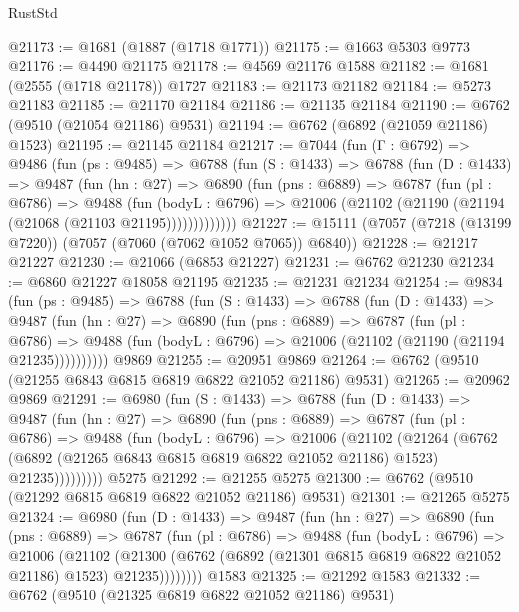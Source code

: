 \begin{lexlean}{RustStd}
\begin{coremodule}
@21173 := @1681 (@1887 (@1718 @1771))
@21175 := @1663 @5303 @9773
@21176 := @4490 @21175
@21178 := @4569 @21176 @1588
@21182 := @1681 (@2555 (@1718 @21178)) @1727
@21183 := @21173 @21182
@21184 := @5273 @21183
@21185 := @21170 @21184
@21186 := @21135 @21184
@21190 := @6762 (@9510 (@21054 @21186) @9531)
@21194 := @6762 (@6892 (@21059 @21186) @1523)
@21195 := @21145 @21184
@21217 := @7044
    (fun (Γ : @6792) =>
    @9486
      (fun (ps : @9485) =>
      @6788
        (fun (S : @1433) =>
        @6788
          (fun (D : @1433) =>
          @9487
            (fun (hn : @27) =>
            @6890
              (fun (pns : @6889) =>
              @6787
                (fun (pl : @6786) =>
                @9488
                  (fun (bodyL : @6796) =>
                  @21006 (@21102 (@21190 (@21194 (@21068 (@21103 @21195)))))))))))))
@21227 := @15111 (@7057 (@7218 (@13199 @7220)) (@7057 (@7060 (@7062 @1052 @7065)) @6840))
@21228 := @21217 @21227
@21230 := @21066 (@6853 @21227)
@21231 := @6762 @21230
@21234 := @6860 @21227 @18058 @21195
@21235 := @21231 @21234
@21254 := @9834
    (fun (ps : @9485) =>
    @6788
      (fun (S : @1433) =>
      @6788
        (fun (D : @1433) =>
        @9487
          (fun (hn : @27) =>
          @6890
            (fun (pns : @6889) =>
            @6787
              (fun (pl : @6786) =>
              @9488 (fun (bodyL : @6796) => @21006 (@21102 (@21190 (@21194 @21235))))))))))
    @9869
@21255 := @20951 @9869
@21264 := @6762 (@9510 (@21255 @6843 @6815 @6819 @6822 @21052 @21186) @9531)
@21265 := @20962 @9869
@21291 := @6980
    (fun (S : @1433) =>
    @6788
      (fun (D : @1433) =>
      @9487
        (fun (hn : @27) =>
        @6890
          (fun (pns : @6889) =>
          @6787
            (fun (pl : @6786) =>
            @9488
              (fun (bodyL : @6796) =>
              @21006
                (@21102
                  (@21264
                    (@6762
                      (@6892 (@21265 @6843 @6815 @6819 @6822 @21052 @21186) @1523)
                      @21235)))))))))
    @5275
@21292 := @21255 @5275
@21300 := @6762 (@9510 (@21292 @6815 @6819 @6822 @21052 @21186) @9531)
@21301 := @21265 @5275
@21324 := @6980
    (fun (D : @1433) =>
    @9487
      (fun (hn : @27) =>
      @6890
        (fun (pns : @6889) =>
        @6787
          (fun (pl : @6786) =>
          @9488
            (fun (bodyL : @6796) =>
            @21006
              (@21102
                (@21300 (@6762 (@6892 (@21301 @6815 @6819 @6822 @21052 @21186) @1523) @21235))))))))
    @1583
@21325 := @21292 @1583
@21332 := @6762 (@9510 (@21325 @6819 @6822 @21052 @21186) @9531)

\end{coremodule}
\end{lexlean}

